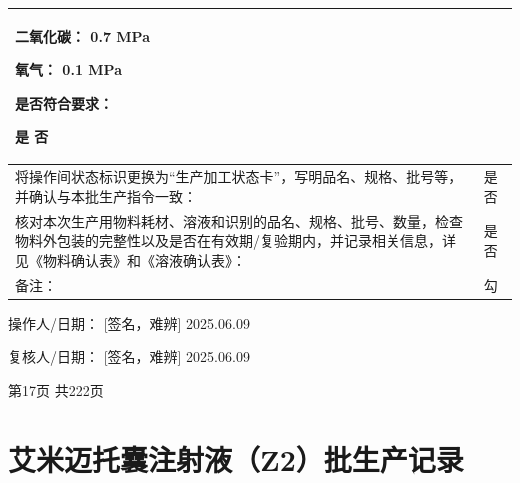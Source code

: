 \documentclass[UTF8,10pt,a4paper,fontset=fandol]{ctexart}
\newcommand{\fieldvalue}[1]{#1}
\newcommand{\handwritten}[1]{#1}
\begin{document}
\begin{tabularx}{\textwidth}{|p{}|X|}
二氧化碳：
\fieldvalue{\handwritten{0.7}} MPa

氧气：
\fieldvalue{\handwritten{0.1}} MPa

是否符合要求：

\fieldvalue{\handwritten{是}} \quad 否\\
\hline
将操作间状态标识更换为“生产加工状态卡”，写明品名、规格、批号等，并确认与本批生产指令一致：
&
\fieldvalue{\handwritten{是}} \quad 否\\
\hline
核对本次生产用物料耗材、溶液和识别的品名、规格、批号、数量，检查物料外包装的完整性以及是否在有效期/复验期内，并记录相关信息，详见《物料确认表》和《溶液确认表》：
&
\fieldvalue{\handwritten{是}} \quad 否\\
\hline
备注：
&
\fieldvalue{\handwritten{勾}}\\
\hline
\end{tabularx}

\normalsize
\medskip

\noindent
操作人/日期：
\fieldvalue{\handwritten{[签名，难辨]}}
\quad
\fieldvalue{\handwritten{2025.06.09}}

\hfill
复核人/日期：
\fieldvalue{\handwritten{[签名，难辨]}}
\quad
\fieldvalue{\handwritten{2025.06.09}}

\begin{center}
第17页 共222页
\end{center}

\newpage

\section*{艾米迈托囊注射液（Z2）批生产记录}
\end{document}
